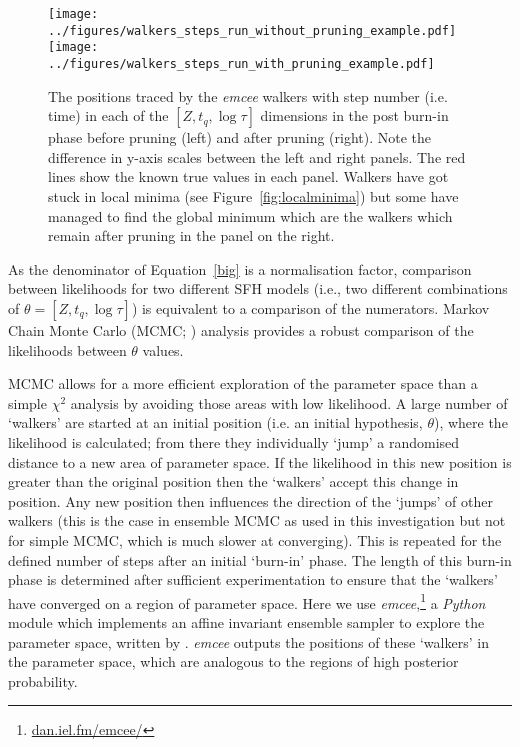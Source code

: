 \documentclass[useAMS,usenatbib]{mn2e}
\begin{document}
\begin{figure*}
\centering
\texttt{[image: ../figures/walkers\_steps\_run\_without\_pruning\_example.pdf]}
\texttt{[image: ../figures/walkers\_steps\_run\_with\_pruning\_example.pdf]}
\caption{The positions traced by the \emph{emcee} walkers with step number (i.e. time) in each of the $[Z, t_q, \log \tau]$ dimensions in the post burn-in phase before pruning (left) and after pruning (right). Note the difference in y-axis scales between the left and right panels. The red lines show the known true values in each panel. Walkers have got stuck in local minima (see Figure~\ref{fig:localminima}) but some have managed to find the global minimum which are the walkers which remain after pruning in the panel on the right.}
\label{fig:comparepruning}
\end{figure*}

As the denominator of Equation~\ref{big} is a normalisation factor, comparison between likelihoods for two different SFH models (i.e., two different combinations of $\theta = [Z, t_q, \log \tau]$) is equivalent to a comparison of the numerators. Markov Chain Monte Carlo (MCMC; \citealt{mackay03, emcee13, GW10}) analysis provides a robust comparison of the likelihoods between $\theta$ values.

MCMC allows for a more efficient exploration of the parameter space than a simple $\chi^2$ analysis by avoiding those areas with low likelihood. A large number of `walkers' are started at an initial position (i.e. an initial hypothesis, $\theta$), where the likelihood is calculated; from there they individually `jump' a randomised distance to a new area of parameter space. If the likelihood in this new position is greater than the original position then the `walkers' accept this change in position. Any new position then influences the direction of the  `jumps' of other walkers (this is the case in ensemble MCMC as used in this investigation but not for simple MCMC, which is much slower at converging). This is repeated for the defined number of steps after an initial `burn-in' phase. The length of this burn-in phase is determined after sufficient experimentation to ensure that the `walkers' have converged on a region of parameter space. Here we use \emph{emcee},\footnote{\url{dan.iel.fm/emcee/}} a \emph{Python} module which implements an affine invariant ensemble sampler to explore the parameter space, written by \cite{emcee13}. \emph{emcee} outputs the positions of these `walkers' in the parameter space, which are analogous to the regions of high posterior probability. 
\end{document}
